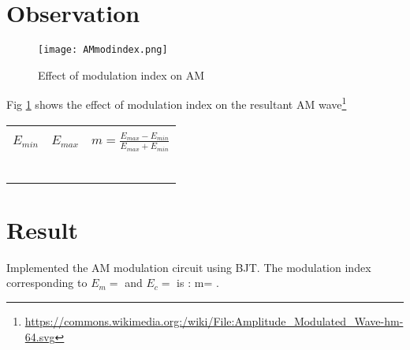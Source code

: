\section*{Observation}


\begin{figure}[h]

\texttt{[image: AMmodindex.png]}
\caption{Effect of modulation index on AM}
\label{AMmodindex}
\end{figure}
\noindent Fig \ref{AMmodindex}  shows the effect of modulation index on the resultant AM wave\footnote{\url{https://commons.wikimedia.org:/wiki/File:Amplitude_Modulated_Wave-hm-64.svg}}
\begin{center}

\begin{tabular}{|l|l|l|}

\hline
 & &\\
 
$E_{min}$  & $E_{max}$ & $m=\frac{E_{max}-E_{min}}{E_{max}+E_{min}}$ \\
 & & \\ \hline
 & & \\ \hline
& & \\ \hline
& & \\ \hline
& & \\ \hline
& & \\ \hline

\end{tabular}
\end{center}


\section*{Result}

Implemented the AM modulation circuit using BJT.
The modulation index corresponding to $E_m=$ \textemdash \textemdash and $E_c=$ \textemdash\textemdash is : m= \textemdash\textemdash .
